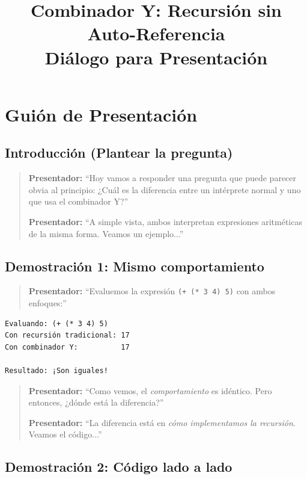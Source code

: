 \documentclass[12pt]{article}
\title{Combinador Y: Recursión sin Auto-Referencia\\
\large Diálogo para Presentación}
\author{}
\date{}
\begin{document}
\maketitle

\section*{Guión de Presentación}

\subsection*{Introducción (Plantear la pregunta)}

\begin{quote}
\textbf{Presentador:} ``Hoy vamos a responder una pregunta que puede parecer obvia al principio: ¿Cuál es la diferencia entre un intérprete normal y uno que usa el combinador Y?''

\textbf{Presentador:} ``A simple vista, ambos interpretan expresiones aritméticas de la misma forma. Veamos un ejemplo...''
\end{quote}

\subsection*{Demostración 1: Mismo comportamiento}

\begin{quote}
\textbf{Presentador:} ``Evaluemos la expresión \texttt{(+ (* 3 4) 5)} con ambos enfoques:''
\end{quote}

\begin{verbatim}
Evaluando: (+ (* 3 4) 5)
Con recursión tradicional: 17
Con combinador Y:          17

Resultado: ¡Son iguales!
\end{verbatim}

\begin{quote}
\textbf{Presentador:} ``Como vemos, el \textit{comportamiento} es idéntico. Pero entonces, ¿dónde está la diferencia?''

\textbf{Presentador:} ``La diferencia está en \textit{cómo implementamos la recursión}. Veamos el código...''
\end{quote}

\subsection*{Demostración 2: Código lado a lado}
\end{document}
